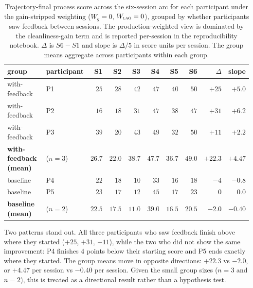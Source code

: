 \begin{table}[htbp]
\centering
\small
\begin{tabular}{llrrrrrrrr}
\hline
\textbf{group} & \textbf{participant} & \textbf{S1} & \textbf{S2} & \textbf{S3} & \textbf{S4} & \textbf{S5} & \textbf{S6} & \textbf{$\Delta$} & \textbf{slope} \\
\hline
with-feedback & P1 & $25$ & $28$ & $42$ & $47$ & $40$ & $50$ & $+25$ & $+5.0$ \\
with-feedback & P2 & $16$ & $18$ & $31$ & $47$ & $38$ & $47$ & $+31$ & $+6.2$ \\
with-feedback & P3 & $39$ & $20$ & $43$ & $49$ & $32$ & $50$ & $+11$ & $+2.2$ \\
\textbf{with-feedback (mean)} & ($n = 3$) & $\mathbf{26.7}$ & $\mathbf{22.0}$ & $\mathbf{38.7}$ & $\mathbf{47.7}$ & $\mathbf{36.7}$ & $\mathbf{49.0}$ & $\mathbf{+22.3}$ & $\mathbf{+4.47}$ \\
\hline
baseline      & P4 & $22$ & $18$ & $10$ & $33$ & $16$ & $18$ &  $-4$ & $-0.8$ \\
baseline      & P5 & $23$ & $17$ & $12$ & $45$ & $17$ & $23$ &   $0$ &  $0.0$ \\
\textbf{baseline (mean)}      & ($n = 2$) & $\mathbf{22.5}$ & $\mathbf{17.5}$ & $\mathbf{11.0}$ & $\mathbf{39.0}$ & $\mathbf{16.5}$ & $\mathbf{20.5}$ & $\mathbf{-2.0}$ & $\mathbf{-0.40}$ \\
\hline
\end{tabular}
\caption{Trajectory-final process score across the six-session arc for each participant under the gain-stripped weighting ($W_g = 0$, $W_{\textsc{lag}} = 0$), grouped by whether participants saw feedback between sessions. The production-weighted view is dominated by the cleanliness-gain term and is reported per-session in the reproducibility notebook. $\Delta$ is $S6 - S1$ and slope is $\Delta / 5$ in score units per session. The group means aggregate across participants within each group.}
\label{tab:results-userstudy-scores}
\end{table}

Two patterns stand out. All three participants who saw feedback finish above where they started ($+25$, $+31$, $+11$), while the two who did not show the same improvement: P4 finishes $4$ points below their starting score and P5 ends exactly where they started. The group means move in opposite directions: $+22.3$ vs $-2.0$, or $+4.47$ per session vs $-0.40$ per session. Given the small group sizes ($n = 3$ and $n = 2$), this is treated as a directional result rather than a hypothesis test.

